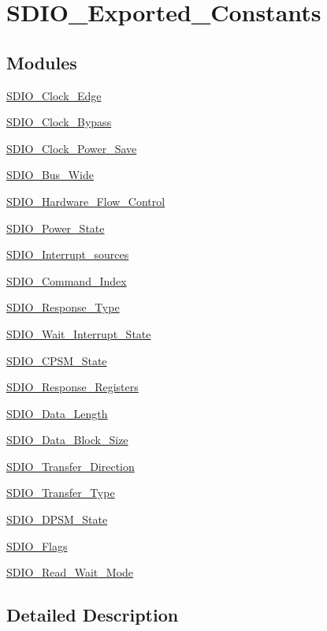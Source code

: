 \hypertarget{group___s_d_i_o___exported___constants}{\section{S\-D\-I\-O\-\_\-\-Exported\-\_\-\-Constants}
\label{group___s_d_i_o___exported___constants}
}
\subsection*{Modules}
\begin{DoxyCompactItemize}
\item 
\hyperlink{group___s_d_i_o___clock___edge}{S\-D\-I\-O\-\_\-\-Clock\-\_\-\-Edge}
\item 
\hyperlink{group___s_d_i_o___clock___bypass}{S\-D\-I\-O\-\_\-\-Clock\-\_\-\-Bypass}
\item 
\hyperlink{group___s_d_i_o___clock___power___save}{S\-D\-I\-O\-\_\-\-Clock\-\_\-\-Power\-\_\-\-Save}
\item 
\hyperlink{group___s_d_i_o___bus___wide}{S\-D\-I\-O\-\_\-\-Bus\-\_\-\-Wide}
\item 
\hyperlink{group___s_d_i_o___hardware___flow___control}{S\-D\-I\-O\-\_\-\-Hardware\-\_\-\-Flow\-\_\-\-Control}
\item 
\hyperlink{group___s_d_i_o___power___state}{S\-D\-I\-O\-\_\-\-Power\-\_\-\-State}
\item 
\hyperlink{group___s_d_i_o___interrupt__sources}{S\-D\-I\-O\-\_\-\-Interrupt\-\_\-sources}
\item 
\hyperlink{group___s_d_i_o___command___index}{S\-D\-I\-O\-\_\-\-Command\-\_\-\-Index}
\item 
\hyperlink{group___s_d_i_o___response___type}{S\-D\-I\-O\-\_\-\-Response\-\_\-\-Type}
\item 
\hyperlink{group___s_d_i_o___wait___interrupt___state}{S\-D\-I\-O\-\_\-\-Wait\-\_\-\-Interrupt\-\_\-\-State}
\item 
\hyperlink{group___s_d_i_o___c_p_s_m___state}{S\-D\-I\-O\-\_\-\-C\-P\-S\-M\-\_\-\-State}
\item 
\hyperlink{group___s_d_i_o___response___registers}{S\-D\-I\-O\-\_\-\-Response\-\_\-\-Registers}
\item 
\hyperlink{group___s_d_i_o___data___length}{S\-D\-I\-O\-\_\-\-Data\-\_\-\-Length}
\item 
\hyperlink{group___s_d_i_o___data___block___size}{S\-D\-I\-O\-\_\-\-Data\-\_\-\-Block\-\_\-\-Size}
\item 
\hyperlink{group___s_d_i_o___transfer___direction}{S\-D\-I\-O\-\_\-\-Transfer\-\_\-\-Direction}
\item 
\hyperlink{group___s_d_i_o___transfer___type}{S\-D\-I\-O\-\_\-\-Transfer\-\_\-\-Type}
\item 
\hyperlink{group___s_d_i_o___d_p_s_m___state}{S\-D\-I\-O\-\_\-\-D\-P\-S\-M\-\_\-\-State}
\item 
\hyperlink{group___s_d_i_o___flags}{S\-D\-I\-O\-\_\-\-Flags}
\item 
\hyperlink{group___s_d_i_o___read___wait___mode}{S\-D\-I\-O\-\_\-\-Read\-\_\-\-Wait\-\_\-\-Mode}
\end{DoxyCompactItemize}


\subsection{Detailed Description}
